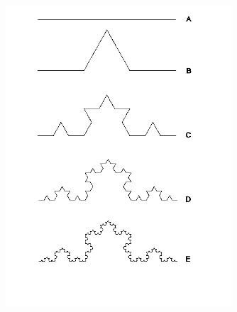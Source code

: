 \begin{figure}[htbp]
   \centering
   \includegraphics[width=0.75\textwidth]{img/Theory/L_Systems/koch.png}
   \caption{}
   \label{fig:kockLS}
\end{figure}





